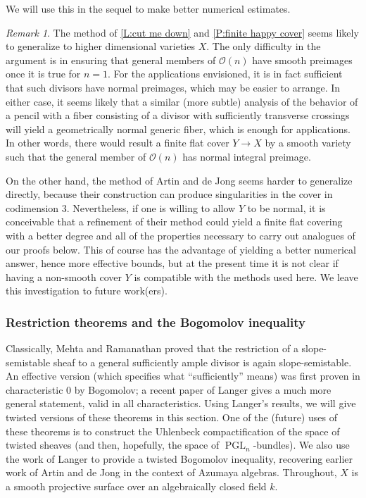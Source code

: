 \documentclass[11pt]{amsart}
\newcommand{\ms}[1]{\mathscr #1}
\newcommand{\PGL}{\operatorname{PGL}}
\renewcommand{\[}{[\!\hspace{0.03em}[}
\renewcommand{\]}{]\!\hspace{0.03em}]}
\renewcommand{\(}{(\!\hspace{0.03em}(}
\renewcommand{\)}{)\!\hspace{0.03em})}
\theoremstyle{definition}
\theoremstyle{remark}
\newtheorem{remark}[lem]{Remark}
\begin{document}
We will use this in the sequel to make better numerical estimates.

\begin{remark} The method of \ref{L:cut me down} and \ref{P:finite 
happy cover} seems likely to generalize to higher dimensional 
varieties $X$.  The only difficulty in the argument is in ensuring 
that general members of ${\ms O}(n)$ have smooth preimages once it is true 
for $n=1$.  For the applications envisioned, it is in fact sufficient 
that such divisors have normal preimages, which may be easier to 
arrange.  In either case, it seems likely that a similar (more 
subtle) analysis of the behavior of a pencil with a fiber consisting 
of a divisor with sufficiently transverse crossings will yield a
geometrically normal generic fiber, which is enough for 
applications.  In other words, there would result a finite flat cover 
$Y\to X$ by a smooth variety such that the general member of ${\ms O}(n)$ 
has normal integral preimage.

On the other hand, the method of Artin and de Jong seems 
harder to generalize directly, because their construction can produce 
singularities in the cover in codimension 3.  Nevertheless, if one is willing to allow $Y$ to be normal, it 
is conceivable that a refinement of their method could yield a finite 
flat covering with a better degree and all of the properties necessary 
to carry out analogues of our proofs below.  This of course has the 
advantage of yielding a better numerical answer, hence more effective 
bounds, but at the present time it is not clear if having a non-smooth 
cover $Y$ is compatible with the methods used here.  We leave this investigation to future work(ers).
\end{remark}

\subsubsection{Restriction theorems and the Bogomolov inequality}\label{S:restriction theorems}

Classically, Mehta and Ramanathan proved that the restriction of a slope-semistable sheaf to 
a general sufficiently ample divisor is again slope-semistable.  An effective version (which specifies 
what ``sufficiently'' means) was first proven in characteristic 0 by 
Bogomolov; a recent paper of Langer \cite{langer} gives a much more general 
statement, valid in all characteristics.  Using Langer's results, we will give twisted 
versions of these theorems in this section.  One of the 
(future) uses of these theorems is to construct the Uhlenbeck 
compactification of the space of twisted sheaves (and then, hopefully, 
the space of $\PGL_{n}$-bundles).  We also use the work of Langer to 
provide a twisted Bogomolov inequality, recovering earlier work of 
Artin and de Jong \cite[\S7.2]{artin-dejong} in the context of Azumaya algebras.  
Throughout, $X$ is a smooth projective surface over an algebraically 
closed field $k$.
\end{document}
